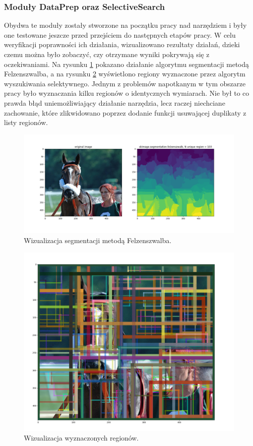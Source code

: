 \documentclass[a4paper,twoside,12pt]{book}
\begin{document}
{\subsubsection{Moduły DataPrep oraz SelectiveSearch}
{Obydwa te moduły zostały stworzone na początku pracy nad narzędziem i były one testowane jeszcze przed przejściem do następnych etapów pracy. W celu weryfikacji poprawności ich działania, wizualizowano rezultaty działań, dzieki czemu można było zobaczyć, czy otrzymane wyniki pokrywają się z oczekiwaniami. Na rysunku \ref{wiz} pokazano działanie algorytmu segmentacji metodą Felzenszwalba, a na rysunku \ref{regions} wyświetlono regiony wyznaczone przez algorytm wyszukiwania selektywnego. Jednym z problemów napotkanym w tym obszarze pracy było wyznaczania kilku regionów o identycznych wymiarach. Nie był to co prawda błąd uniemożliwiający działanie narzędzia, lecz raczej niechciane zachowanie, które zlikwidowano poprzez dodanie funkcji usuwającej duplikaty z listy regionów.
}
\begin{figure}[h!]


\centering
\includegraphics[scale=0.3]{example.png}
\caption{Wizualizacja segmentacji metodą Felzenszwalba.}
\label{wiz}
\end{figure}



\begin{figure}[h!]


\centering
\includegraphics[scale=0.2]{example2.png}
\caption{Wizualizacja wyznaczonych regionów.}
\label{regions}
\end{figure}

}
\end{document}
